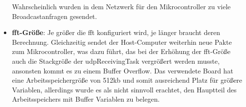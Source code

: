 \documentclass[../EDF Master Thesis.tex]{subfiles}
\begin{document}
\begin{itemize}
            Wahrscheinlich wurden in dem Netzwerk für den Mikrocontroller zu viele Broadcastanfragen gesendet.
        \item \textbf{\ac{fft}-Größe}: Je größer die \ac{fft} konfiguriert wird, je länger braucht deren Berechnung.
            Gleichzeitig sendet der Host-Computer weiterhin neue Pakte zum Mikrocontroller, was dazu führt, das bei der Erhöhung der \ac{fft}-Größe auch die Stackgröße der udpReceivingTask vergrößert werden musste, ansonsten kommt es zu einem Buffer Overflow.
            Das verwendete Board hat eine Arbeitsspeichergröße von 512kb und somit ausreichend Platz für größere Variablen, allerdings wurde es als nicht sinnvoll erachtet, den Hauptteil des Arbeitsspeichers mit Buffer Variablen zu belegen.
    \end{itemize}
\end{document}
